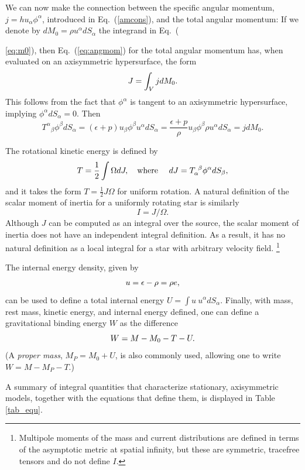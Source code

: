 \documentclass[12pt]{article}
\def\a{\alpha}
\def\b{\beta}
\def\be{\begin{equation}}
\def\ee{\end{equation}}
\def\a{\alpha}
\def\b{\beta}
\begin{document}
We can now make the connection between the specific angular momentum, $j=hu_\alpha\phi^\alpha$, 
introduced in Eq.~(\ref{amcons}), and the total angular momentum:  If we denote by  
$dM_0 = \rho u^\alpha dS_\alpha$ the integrand in Eq.~({\ref{eq:m0}), then Eq.~(\ref{eq:angmom}) 
for the total angular momentum has, when evaluated on an axisymmetric hypersurface, 
the form 
\be 
  J = \int_V j dM_0.  
\label{eq:angmom3}\index{rotating stars!angular momentum}\ee
This follows from the fact that $\phi^\a$ is tangent to an axisymmetric hypersurface, 
implying $\phi^\a dS_\a =0$.  Then 
\[
T^\a{}_\b\phi^\b dS_\a = (\epsilon+p) u_\b\phi^\b u^\a dS_\a 
        = \frac{\epsilon+p}\rho u_\b\phi^\b \rho u^\a dS_\a = j dM_0.
\] 
     
The rotational kinetic energy is defined by  
\be 
T=\frac12\int \Omega dJ, \quad\mbox{where } \quad 
        dJ = T_\alpha^{\ \beta}\phi^\alpha dS_\beta, 
\index{kinetic energy of rotation|textbf}\index{rotating stars!kinetic energy}\ee
and it takes the form $\displaystyle T=\frac12 J\Omega$ for uniform rotation.
A natural definition of the scalar moment of inertia for a uniformly
rotating star is similarly  
\be I=J/ \Omega. 
\label{eq:I}\ee
{}
%
Although $J$ can be computed as an 
integral over the source, the scalar moment of inertia does not have an 
independent integral definition. As a result, it has no natural definition
as a local integral for a star with arbitrary velocity field. 
\footnote{Multipole moments of the mass and current distributions are defined
in terms of the asymptotic metric at spatial infinity, but these 
are symmetric, tracefree tensors and do not define $I$.}  

The internal energy density, given by
\be
u=\epsilon-\rho=\rho e,
\index{internal energy|textbf}\label{energy density!internal|textbf}
\ee
can be used to define a total internal energy 
$\displaystyle U=\int u\ u^\alpha dS_\alpha$.
Finally, with mass, rest mass, kinetic energy, and internal energy defined, 
one can define a gravitational binding energy $W$ as the difference 
\be
W = M - M_0 - T - U.
\index{rotating stars!binding energy}\index{binding energy|textbf}\ee
(A {\em proper mass}, $M_P=M_0 +U$, is also commonly used, allowing 
one to write $W = M-M_P-T$.) 


A summary of integral quantities that characterize stationary, 
axisymmetric models, together with the equations that define them, 
is displayed in Table \ref{tab_equ}.
   

}
\end{document}
